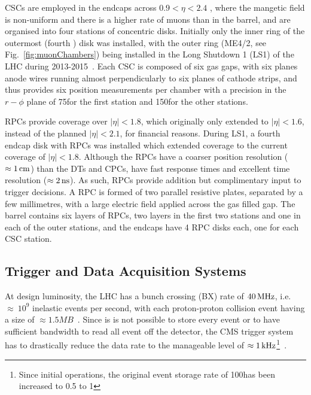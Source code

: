 CSCs are employed in the endcaps across $0.9 < \eta < 2.4$ , where the mangetic field is non-uniform and there is a higher rate of muons than in the barrel, and are organised into four stations of concentric disks.
Initially only the inner ring of the outermost (fourth ) disk was installed, with the outer ring (ME4/2, see Fig.~\ref{fig:muonChambers}) being installed in the Long Shutdown 1 (LS1) of the LHC during 2013-2015~\cite{Battilana:2017mrm}.
Each CSC is composed of six gas gaps, with six planes anode wires running almost perpendicularly to six planes of cathode strips, and thus provides six position measurements per chamber with a precision in the $r-\phi$ plane of 75\mum for the first station and 150\mum for the other stations\cite{CMS:1997iti}.

RPCs provide coverage over $|\eta| < 1.8$, which originally only extended to $|\eta| < 1.6$, instead of the planned $|\eta| < 2.1$, for financial reasons. 
During LS1, a fourth endcap disk with RPCs was installed which extended coverage to the current coverage of $|\eta| < 1.8$\cite{Battilana:2017mrm}.
Although the RPCs have a coarser position resolution ($\approx 1\,\text{cm}$) than the DTs and CPCs, have fast response times and excellent time resolution ($\approx 2\text{\,ns}$).
As such, RPCs provide addition but complimentary input to trigger decisions.
A RPC is formed of two parallel resistive plates, separated by a few millimetres, with a large electric field applied across the gas filled gap.
The barrel contains six layers of RPCs, two layers in the first two stations and one in each of the outer stations, and the endcaps have 4 RPC disks each, one for each CSC station.

\subsection{Trigger and Data Acquisition Systems}\label{subsec:trigger}
At design luminosity, the LHC has a bunch crossing (BX) rate of $40\text{\,MHz}$, i.e. $\approx~10^{9}$ inelastic events per second, with each proton-proton collision event having a size of $\approx 1.5MB$~\cite{Bayatian:2006nff}.
Since is is not possible to store every event or to have sufficient bandwidth to read all event off the detector, the CMS trigger system~\cite{Dasu:2000ge,Sphicas:2002gg} has to drastically reduce the data rate to the manageable level of $\approx 1\text{\,kHz}$\footnote{Since initial operations, the original event storage rate of 100\Hz has been increased to 0.5 to 1\kHz}~\cite{Dasu:2000ge,phase1L1TDR}.

